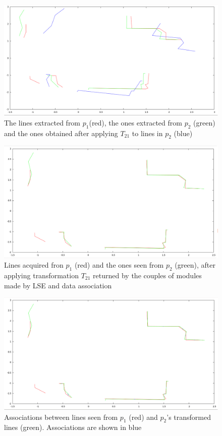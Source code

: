 \documentclass[a4paper, onecolumn]{report}
\begin{document}
\begin{figure}[htbp]
\centering
\includegraphics[width=1.0\textwidth]{images/two_frames/P_PTP_PT_after_LS.png}
\caption{The lines extracted from $p_1$(red), the ones extracted from $p_2$ (green) and the ones obtained after applying $T_{21}$ to lines in $p_2$ (blue)}
\end{figure}
\begin{figure}[htbp]
\centering
\includegraphics[width=1.0\textwidth]{images/two_frames/data_association_no_eval.png}
\caption{Lines acquired fron $p_1$	(red) and the ones seen from $p_2$ (green), after applying transformation $T_{21}$ returned by the couples of modules made by LSE and data association}
\end{figure}
\begin{figure}[htbp]
\centering
\includegraphics[width=1.0\textwidth]{images/two_frames/data_association.png}
\caption{Associations between lines seen from $p_1$ (red) and $p_2$'s transformed lines (green). Associations are shown in blue}
\end{figure}
\end{document}
